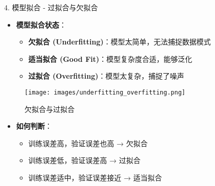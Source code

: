 \documentclass[
  ignorenonframetext,
  aspectratio=169,
  chinese-hans,
]{beamer}
\providecommand{\tightlist}{%
  \setlength{\itemsep}{0pt}\setlength{\parskip}{0pt}}\usepackage{longtable,booktabs,array}
\begin{document}
\begin{frame}{4. 模型拟合 - 过拟合与欠拟合}
\label{ux6a21ux578bux62dfux5408---ux8fc7ux62dfux5408ux4e0eux6b20ux62dfux5408}
\begin{itemize}
\tightlist
\item
  \textbf{模型拟合状态}：

  \begin{itemize}
  \tightlist
  \item
    \textbf{欠拟合 (Underfitting)}：模型太简单，无法捕捉数据模式
  \item
    \textbf{适当拟合 (Good Fit)}：模型复杂度合适，能够泛化
  \item
    \textbf{过拟合 (Overfitting)}：模型太复杂，捕捉了噪声
  \end{itemize}
\end{itemize}

\begin{figure}[H]

{\centering \texttt{[image: images/underfitting\_overfitting.png]}

}

\caption{欠拟合与过拟合}

\end{figure}%

\begin{itemize}
\tightlist
\item
  \textbf{如何判断}：

  \begin{itemize}
  \tightlist
  \item
    训练误差高，验证误差也高 → 欠拟合
  \item
    训练误差低，验证误差高 → 过拟合
  \item
    训练误差适中，验证误差接近 → 适当拟合
  \end{itemize}
\end{itemize}
\end{frame}
\end{document}
